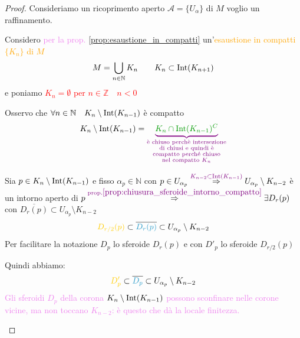         \begin{proof}
        \mbox{}

        Consideriamo un ricoprimento aperto $\mathcal{A} = \{U_\alpha\}$ di $M$ voglio un raffinamento.
        
        Considero \textcolor{violet}{per la prop. \ref{prop:esaustione_in_compatti}} un'\textcolor{orange}{esaustione in compatti $\{K_n\}$ di $M$}
        \[ M= \bigcup_{n \in \mathbb{N}} K_n \qquad K_n \subset \operatorname{Int}(K_{n+1}) \]
        e poniamo \textcolor{red}{$K_n = \emptyset$ per $n \in \mathbb{Z} \quad n < 0$}
        
        Osservo che $\forall n \in \mathbb{N} \quad K_n \setminus \operatorname{Int}(K_{n-1})$ è compatto
        \[ K_n \setminus \Int(K_{n-1})= \textcolor{violet}{\underbrace{\textcolor{verde}{K_n \cap \Int(K_{n-1})^C}}_{\substack{\text{è chiuso perchè intersezione} \\ \text{di chiusi e quindi è} \\ \text{compatto perché chiuso} \\ \text{nel compatto }  K_n}}} \]
        
        Sia $p \in K_n \setminus \operatorname{Int}(K_{n-1})$ e fisso $\alpha_p \in \mathbb{N}$ con $p \in U_{\alpha_p} 
        \overset{\textcolor{violet}{K_{n-2} \subset \operatorname{Int}(K_{n-1}) }}{\Rightarrow} U_{\alpha_p} \setminus K_{n-2}$
        è un intorno aperto di 
        $p \overset{\textcolor{violet}{\text{prop.} \ref{prop:chiusura_sferoide_intorno_compatto}}}{\Rightarrow} \exists D_r(p)$ con $\overline{D_r(p)} \subset U_{\alpha_p} \setminus K_{n-2}$ 
        \begin{equation}
        \label{eq:varieta_topologica_paracompatta_dim_1}
        \textcolor{amber}{D_{r/2}(p)} \subset \overline{\textcolor{celeste}{D_r(p)}} \subset U_{\alpha_p} \setminus K_{n-2}
        \end{equation}
        Per facilitare la notazione
        \textcolor{celeste}{$D_p$} lo sferoide \textcolor{celeste}{$D_{r}(p)$} e con 
        \textcolor{amber}{$D'_p$} lo sferoide \textcolor{amber}{$D_{r/2}(p)$}

        Quindi abbiamo:
        \begin{equation}
        \label{eq:varieta_topologica_paracompatta_dim_2}
        \textcolor{amber}{D'_p} \subset \overline{\textcolor{celeste}{D_p}} \subset U_{\alpha_p} \setminus K_{n-2}
        \end{equation}
        \textcolor{violet}{Gli sferoidi $D_p$ della corona $K_n\setminus\operatorname{Int}(K_{n-1})$ possono sconfinare
        nelle corone vicine, ma non toccano $K_{n-2}$: è questo che dà la locale finitezza.}
        \begin{center}
\end{center}
\end{proof}
